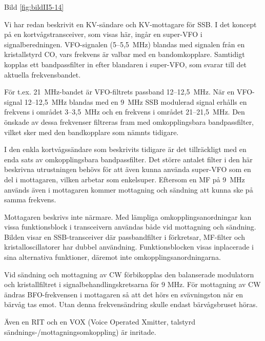 Bild \ref{fig:bildII5-14}

Vi har redan beskrivit en KV-sändare och KV-mottagare för SSB. I det
koncept på en kortvågstransceiver, som visas här, ingår en super-VFO i
signalberedningen. VFO-signalen (5--5,5~MHz) blandas med signalen
från en kristallstyrd CO, vars frekvens är valbar med en
bandomkopplare. Samtidigt kopplas ett bandpassfilter in efter
blandaren i super-VFO, som svarar till det aktuella frekvensbandet.

För t.ex. 21~MHz-bandet är VFO-filtrets passband 12--12,5~MHz. När en
VFO-signal 12--12,5~MHz blandas med en 9~MHz SSB modulerad signal
erhålls en frekvens i området 3--3,5~MHz och en frekvens i området
21--21,5~MHz. Den önskade av dessa frekvenser filtreras fram med
omkopplingsbara bandpassfilter, vilket sker med den bandkopplare som
nämnts tidigare.

I den enkla kortvågssändare som beskrivits tidigare är det
tillräckligt med en enda sats av omkopplingsbara bandpassfilter. Det
större antalet filter i den här beskrivna utrustningen behövs för att
även kunna använda super-VFO som en del i mottagaren, vilken arbetar
som enkelsuper. Eftersom en MF på 9~MHz används även i mottagaren
kommer mottagning och sändning att kunna ske på samma frekvens.

Mottagaren beskrivs inte närmare. Med lämpliga omkopplingsanordningar
kan vissa funktionsblock i transceivern användas både vid mottagning
och sändning. Bilden visar en SSB-transceiver där passbandfilter i
förkretsar, MF-filter och kristalloscillatorer har dubbel
användning. Funktionsblocken visas inplacerade i sina alternativa
funktioner, däremot inte omkopplingsanordningarna.

Vid sändning och mottagning av CW förbikopplas den balanserade
modulatorn och kristallfiltret i signalbehandlingskretsarna för 9
MHz. För mottagning av CW ändras BFO-frekvensen i mottagaren så att
det hörs en svävningston när en bärvåg tas emot. Utan denna
frekvensändring skulle endast bärvågsbruset höras.

Även en RIT och en VOX (Voice Operated Xmitter, talstyrd
sändnings-/mottagningsomkoppling) är inritade.

